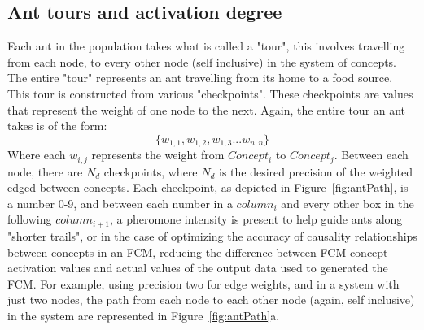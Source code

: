 \documentclass{umm-senior-sem}
\begin{document}
\subsection{Ant tours and activation degree}
\label{sec:activation}
Each ant in the population takes what is called a "tour", this involves travelling from each node, to every other node (self inclusive) in the system of concepts. The entire "tour" represents an ant travelling from its home to a food source. This tour is constructed from various "checkpoints". These checkpoints are values that represent the weight of one node to the next. Again, the entire tour an ant takes is of the form: 
\begin{equation}
 \big\{w_{1,1}, w_{1,2}, w_{1,3} ... w_{n,n}\big\} 
\end{equation}
Where each $w_{i,j}$ represents the weight from $Concept_i$ to $Concept_j$.
Between each node, there are $N_d$ checkpoints, where $N_d$ is the desired precision of the weighted edged between concepts. Each checkpoint, as depicted in Figure~\ref{fig:antPath}, is a number 0-9, and between each number in a $column_i$ and every other box in the following $column_{i+1}$, a pheromone intensity is present to help guide ants along "shorter trails", or in the case of optimizing the accuracy of causality relationships between concepts in an FCM, reducing the difference between FCM concept activation values and actual values of the output data used to generated the FCM. For example, using precision two for edge weights, and in a system with just two nodes, the path from each node to each other node (again, self inclusive) in the system are represented in Figure~\ref{fig:antPath}a.
\end{document}
